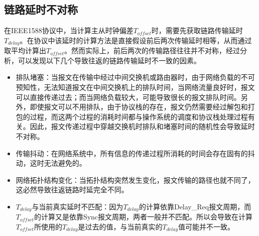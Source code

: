 
\subsection{链路延时不对称}
\label{sec:1588_problem_1}
在IEEE1588协议中，当计算主从时钟偏差$T_{offset}$时，需要先获取链路传输延时$T_{delay}$。在协议中该延时的计算方法是直接假设前后两次传输延时相等，从而通过取平均计算出$T_{offset}$。然而实际上，前后两次的传输路径往往并不对称，经过分析，可以发现以下几个导致往返的链路传输延时不一致的因素\supercite{55}。
\begin{itemize}[noitemsep,topsep=0pt,parsep=0pt,partopsep=0pt]
	\item 排队堵塞：当报文在传输中经过中间交换机或路由器时，由于网络负载的不可预知性，无法知道报文在中间交换机上的排队时间，当网络流量良好时，报文可以直接传递过去；而当网络负载较大，可能导致很长的报文排队时间。另外，即使报文可以不用排队，由于协议栈的存在，报文仍然需要经过解包和打包的过程，而这两个过程的消耗时间都与操作系统的调度和协议栈处理过程有关。因此，报文传递过程中穿越交换机时排队和堵塞时间的随机性会导致延时不对称\supercite{46}。
	\item 传输抖动：在网络系统中，所有信息的传递过程所消耗的时间会存在固有的抖动，这时无法避免的。
	\item 网络拓扑结构变化：当拓扑结构突然发生变化，报文传输的路径也就不同了，这必然导致往返链路时延完全不同。
	\item $T_{delay}$与当前真实延时不匹配：因为$T_{delay}$的计算依靠Delay\_Req报文周期，而$T_{offset}$的计算又是依靠Sync报文周期，两者一般并不匹配。所以会导致在计算$T_{offset}$所使用的$T_{delay}$是过去的值，与当前真实的$T_{delay}$值可能并不一致。
\end{itemize}

